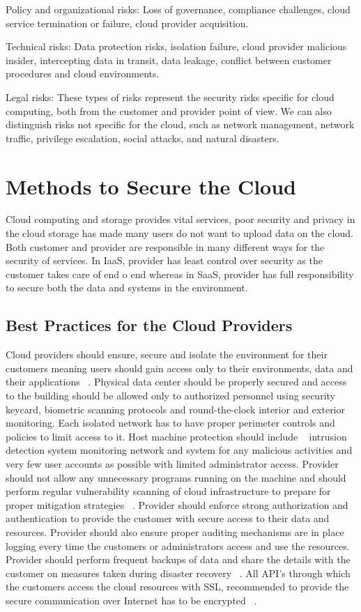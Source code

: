     Policy and organizational risks: Loss of governance, compliance challenges, 
cloud service termination or failure, cloud provider acquisition.

    Technical risks: Data protection risks, isolation failure, cloud provider 
malicious insider, intercepting data in transit, data leakage, conflict 
between customer procedures and cloud environments.

    Legal risks: These types of risks represent the security risks specific 
for cloud computing, both from the customer and provider point of view. 
We can also distinguish risks not specific for the cloud, such as network 
management, network traffic, privilege escalation, social attacks, and 
natural disasters.

\section{Methods to Secure the Cloud}
Cloud computing and storage provides vital services, poor security and 
privacy in the cloud storage has made many users do not want to 
upload data on the cloud. Both customer and provider are responsible in many
different ways for the security of services. In IaaS, provider has least control
over security as the customer takes care of end o end whereas in SaaS, provider
has full responsibility to secure both the data and systems in the environment.

\subsection{Best Practices for the Cloud Providers}
Cloud providers should ensure, secure and isolate the environment for their 
customers meaning users should gain access only to their environments, data
and their applications ~\cite{hid-sp18-513-vmware}. Physical data center should be properly secured 
and access to the building should be allowed only to authorized personnel 
using security keycard, biometric scanning protocols and round-the-clock
interior and exterior monitoring. Each isolated network has to have proper 
perimeter controls and policies to limit access to it.
Host machine protection should include ~\cite{hid-sp18-513-diversity} intrusion detection system 
monitoring network and system for any malicious activities and very 
few user accounts as possible with limited administrator access. Provider
should not allow any unnecessary programs running on the machine and should 
perform regular vulnerability scanning of cloud infrastructure to prepare 
for proper mitigation strategies ~\cite{hid-sp18-513-winkler}. Provider should enforce strong 
authorization and authentication to provide the customer with secure access 
to their data and resources. Provider should also ensure proper auditing 
mechanisms are in place logging every time the customers or administrators
access and use the resources. Provider should perform frequent backups of 
data and share the details with the customer on measures taken during 
disaster recovery ~\cite{hid-sp18-513-vmware}. All API's through which the customers access
the cloud resources with SSL, recommended to provide the secure
communication over Internet has to be encrypted ~\cite{hid-sp18-513-diversity}.

